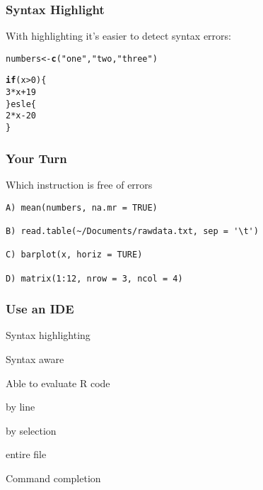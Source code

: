 \documentclass[12pt]{beamer}\usepackage[]{graphicx}\usepackage[]{color}
\makeatletter
\newcommand{\hlstr}[1]{\textcolor[rgb]{0.192,0.494,0.8}{#1}}%
\newcommand{\hlkwd}[1]{\textcolor[rgb]{0.737,0.353,0.396}{\textbf{#1}}}%
\newenvironment{kframe}{%
 \def\at@end@of@kframe{}%
 \ifinner\ifhmode%
  \def\at@end@of@kframe{\end{minipage}}%
  \begin{minipage}{\columnwidth}%
 \fi\fi%
 \def\FrameCommand##1{\hskip\@totalleftmargin \hskip-\fboxsep
 \colorbox{shadecolor}{##1}\hskip-\fboxsep
     \hskip-\linewidth \hskip-\@totalleftmargin \hskip\columnwidth}%
 \MakeFramed {\advance\hsize-\width
   \@totalleftmargin\z@ \linewidth\hsize
   \@setminipage}}%
 {\par\unskip\endMakeFramed%
 \at@end@of@kframe}
\newenvironment{knitrout}{}{} %
\makeatother
\begin{document}
\begin{frame}[fragile]
\frametitle{Syntax Highlight}

{\hilit With highlighting it's easier to detect syntax errors:}
\begin{knitrout}\footnotesize
{}\color{fgcolor}\begin{kframe}
\begin{alltt}
numbers <- \hlkwd{c}(\hlstr{"one"}, \hlstr{"two, "}three")
\end{alltt}
\end{kframe}
\end{knitrout}

\begin{knitrout}\footnotesize
{}\color{fgcolor}\begin{kframe}
\begin{alltt}
\hlkwd{if} (x > 0) \{
  3 * x + 19
\} esle \{
  2 * x - 20
\}
\end{alltt}
\end{kframe}
\end{knitrout}



\end{frame}


\begin{frame}[fragile]
\frametitle{Your Turn}

{\mdlit Which instruction is free of errors}
\begin{verbatim}
A) mean(numbers, na.mr = TRUE)

B) read.table(~/Documents/rawdata.txt, sep = '\t')

C) barplot(x, horiz = TURE)

D) matrix(1:12, nrow = 3, ncol = 4)
\end{verbatim}

\end{frame}


\begin{frame}[fragile]
\frametitle{Use an IDE}

\bi
  \item Syntax highlighting
  \item Syntax aware 
  \item Able to evaluate R code
  \bi
    \item by line
    \item by selection
    \item entire file
  \ei
  \item Command completion
\ei

\end{frame}
\end{document}

